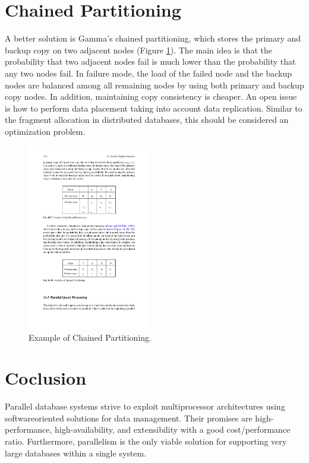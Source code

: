 \documentclass{vldb}
\begin{document}
\section{Chained Partitioning}
A better solution is Gamma’s chained partitioning, which stores the primary and backup copy on two adjacent nodes (Figure \ref{fig:chained}). The main idea is that the probability that two adjacent nodes fail is much lower than the probability that any two nodes fail. In failure mode, the load of the failed node and the backup nodes are balanced among all remaining nodes by using both primary and backup copy nodes. In addition, maintaining copy consistency is cheaper. An open issue is how to perform data placement taking into account data replication. Similar to the fragment allocation in distributed databases, this should be considered an optimization problem.

\begin{figure}[htb]
\centering
\includegraphics[width=0.48\textwidth]{chained}
\caption{Example of Chained Partitioning.}
\label{fig:chained}
\end{figure}

\section{Coclusion}
Parallel database systems strive to exploit multiprocessor architectures using softwareoriented solutions for data management. Their promises are high-performance, high-availability, and extensibility with a good cost/performance ratio. Furthermore, parallelism is the only viable solution for supporting very large databases within a single system.
\end{document}
